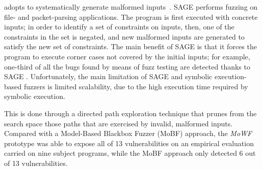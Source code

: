 
 adopts  to systematically generate malformed inputs~\cite{godefroid2012sage}. SAGE performs fuzzing on file- and packet-parsing applications. 
The program is first executed with concrete inputs; in order to identify a set of constraints on inputs, then, one of the constraints in the set is negated, and new malformed inputs are generated to satisfy the new set of constraints. 
The main benefit of SAGE is that it forces the program to execute corner cases not covered by the initial inputs; for example, 
one-third of all the bugs found by means of fuzz testing are detected thanks to SAGE \cite{bounimova2013billions}.
Unfortunately, the main limitation of SAGE and symbolic execution-based fuzzers is limited scalability, due to the high execution time required by symbolic execution.



 This is done through a directed path exploration technique that prunes from the search space those paths that are exercised by invalid, malformed inputs.
Compared with a Model-Based Blackbox Fuzzer (MoBF) approach, the \emph{MoWF} prototype was able to expose all of 13 vulnerabilities on an empirical evaluation carried on nine subject programs, while the MoBF approach only detected 6 out of 13 vulnerabilities. 

